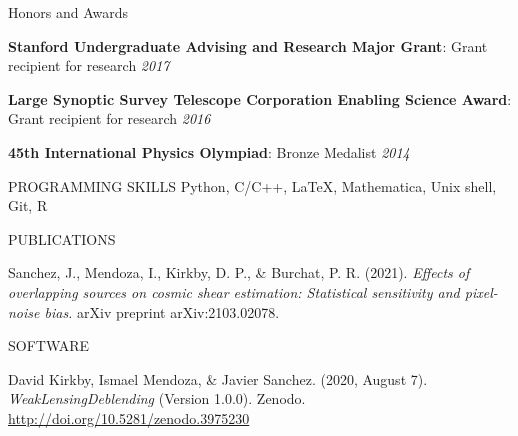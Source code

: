 \begin{rSection}{Honors and Awards} \itemsep -3pt \vspace*{-.25cm}
\item \textbf{Stanford Undergraduate Advising and Research Major Grant}: Grant recipient for research \hfill {\em 2017}

\item \textbf{Large Synoptic Survey Telescope Corporation Enabling Science Award}: Grant recipient for research \hfill {\em 2016}

\item \textbf{45th International Physics Olympiad}:  Bronze Medalist \hfill {\em 2014}
\end{rSection}
\begin{rSection}{PROGRAMMING SKILLS}
%
Python, C/C++, \LaTeX, Mathematica, Unix shell, Git, R
\end{rSection}


\begin{rSection}{PUBLICATIONS}
%
\vspace*{-1em}
\item Sanchez, J., Mendoza, I., Kirkby, D. P., \& Burchat, P. R. (2021). \textit{Effects of overlapping sources on cosmic shear estimation: Statistical sensitivity and pixel-noise bias.} arXiv preprint arXiv:2103.02078.
\end{rSection}

\begin{rSection}{SOFTWARE}
%
\vspace*{-1em}
\item David Kirkby, Ismael Mendoza, \& Javier Sanchez. (2020, August 7). \textit{WeakLensingDeblending} (Version 1.0.0). Zenodo. \url{http://doi.org/10.5281/zenodo.3975230}
%
\end{rSection}


